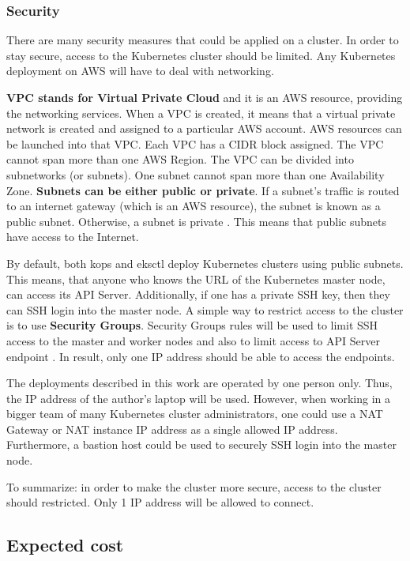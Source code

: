 \subsubsection{Security}

There are many security measures that could be applied on a cluster. In order to stay secure, access to the Kubernetes cluster should be limited. Any Kubernetes deployment on AWS will have to deal with networking.

\textbf{VPC stands for Virtual Private Cloud} and it is an AWS resource, providing the networking services. When a VPC is created, it means that a virtual private network is created and assigned to a particular AWS account. AWS resources can be launched into that VPC. Each VPC has a CIDR block assigned. The VPC cannot span more than one AWS Region. The VPC can be divided into subnetworks (or subnets). One subnet cannot span more than one Availability Zone. \textbf{Subnets can be either public or private}. If a subnet's traffic is routed to an internet gateway (which is an AWS resource), the subnet is known as a public subnet. Otherwise, a subnet is private \cite{aws-vpc}. This means that public subnets have access to the Internet.

By default, both kops and eksctl deploy Kubernetes clusters using public subnets. This means, that anyone who knows the URL of the Kubernetes master node, can access its API Server. Additionally, if one has a private SSH key, then they can SSH login into the master node. A simple way to restrict access to the cluster is to use \textbf{Security Groups}. Security Groups rules will be used to limit SSH access to the master and worker nodes and also to limit access to API Server endpoint \cite{online-kops-cs}. In result, only one IP address should be able to access the endpoints.

The deployments described in this work are operated by one person only. Thus, the IP address of the author's laptop will be used. However, when working in a bigger team of many Kubernetes cluster administrators, one could use a NAT Gateway or NAT instance IP address as a single allowed IP address. Furthermore, a bastion host could be used to securely SSH login into the master node\cite{aws-bastion}.

To summarize: in order to make the cluster more secure, access to the cluster should restricted. Only 1 IP address will be allowed to connect.

\subsection{Expected cost}

